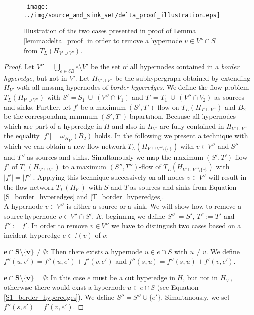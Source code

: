 \begin{figure}
\centering
\texttt{[image: ../img/source\_and\_sink\_set/delta\_proof\_illustration.eps]}
\caption{Illustration of the two cases presented in proof of Lemma \ref{lemma:delta_proof} in
         order to remove a hypernode $v \in V'' \cap S$ from $T_L(H_{V' \cup V''})$. }
\label{img:delta_proof_illustration}
\end{figure}

\begin{proof}
Let $V'' = \bigcup_{e \in \delta B} e \setminus V'$ be the set of all hypernodes contained
in a \emph{border hyperedge}, but not in $V'$. Let $H_{V' \cup V''}$ be the subhypergraph
obtained by extending $H_{V'}$ with all missing hypernodes of \emph{border hyperedges}. 
We define the flow problem $T_L(H_{V' \cup V''})$ with $S' = S_1\ \cup\ (V'' \cap V_1)$ and 
$T' = T_1\ \cup\ (V'' \cap V_2)$ as sources and sinks. Further, let $f'$ be a maximum $(S',T')$-flow 
on $T_L(H_{V' \cup V''})$ and $B_2$ be the corresponding minimum $(S',T')$-bipartition. Because
all hypernodes which are part of a hyperedge in $H$ and also in $H_{V'}$ are fully contained
in $H_{V' \cup V''}$ the equality $|f'| = \omega_{H_{V'}}(B_2)$ holds. In the following we 
present a technique with which we can obtain a new flow network $T_L(H_{V' \cup V''\setminus \{v\}})$
with $v \in V''$ and $S''$ and $T''$ as sources and sinks. Simultanously we map
the maximum $(S',T')$-flow $f'$ of $T_L(H_{V' \cup V''})$ to a maximum $(S'',T'')$-flow
of $T_L(H_{V' \cup V''\setminus \{v\}})$ with $|f'| = |f''|$. Applying this technique successively
on all nodes $v \in V''$ will result in the flow network $T_L(H_{V'})$ with $S$ and $T$ as sources and sinks
from Equation \ref{S_border_hyperedges} and \ref{T_border_hyperedges}. \\
A hypernode $v \in V''$ is either a source or a sink. We will show how to remove a source
hypernode $v \in V'' \cap S'$. At beginning we define $S'' := S'$, $T'' := T'$ and 
$f'' := f'$. In order to remove $v \in V''$ we have to distingush two cases 
based on a incident hyperedge $e \in I(v)$ of $v$: 

$\mathbf{e \cap S \setminus \{v\} \neq \emptyset}$:
Then there exists a hypernode $u \in e \cap S$ with $u \neq v$. We define
$f''(u,e') = f''(u,e') + f'(v,e')$ and $f''(s,u) = f''(s,u) + f'(v,e')$. 

$\mathbf{e \cap S \setminus \{v\} = \emptyset}$:
In this case $e$ must be a cut hyperedge in $H$, but not in $H_{V'}$, otherwise
there would exist a hypernode $u \in e \cap S$ (see Equation \ref{S1_border_hyperedges}).
We define $S'' = S'' \cup \{e'\}$. Simultanously, we set  
$f''(s,e') = f'(v,e')$. 


\end{proof}
